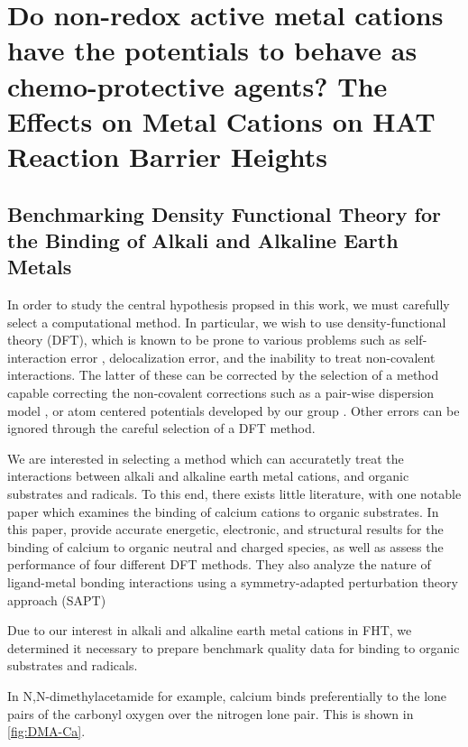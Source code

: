 
\chapter{Do non-redox active metal cations have the potentials to behave as
  chemo-protective agents? The Effects on Metal Cations on HAT Reaction Barrier
  Heights}
\label{ch:hat}

\section{Benchmarking Density Functional Theory for the Binding of
  Alkali and Alkaline Earth Metals}

In order to study the central hypothesis propsed in this work, we must carefully
select a computational method. In particular, we wish to use density-functional
theory (DFT), which is known to be prone to various problems such as
self-interaction error \cite{Dutoi2006}, delocalization
error,\cite{OterodelaRoza2014} and the inability to treat non-covalent
interactions.\cite{Johnson2009,DiLabio2016} The latter of these can be corrected
by the selection of a method capable correcting the non-covalent corrections
such as a pair-wise dispersion model , or atom
centered potentials developed by our group
. Other errors can be ignored through the
careful selection of a DFT method.

We are interested in selecting a method which can accuratetly treat
the interactions between alkali and alkaline earth metal cations, and
organic substrates and radicals. To this end, there exists little
literature, with one notable paper\cite{Suarez2011} which examines the
binding of calcium cations to organic substrates. In this paper,
\citet{Suarez2011} provide accurate energetic, electronic, and
structural results for the binding of calcium to organic neutral and
charged species, as well as assess the performance of four different
DFT methods. They also analyze the nature of ligand-metal bonding
interactions using a symmetry-adapted perturbation theory approach
(SAPT) 

Due to our interest in alkali and alkaline earth metal cations in FHT,
we determined it necessary to prepare benchmark quality data for
binding to organic substrates and radicals.

 In N,N-dimethylacetamide for example, calcium
  binds preferentially to the lone pairs of the carbonyl oxygen over
  the nitrogen lone pair. This is shown in \ref{fig:DMA-Ca}.

